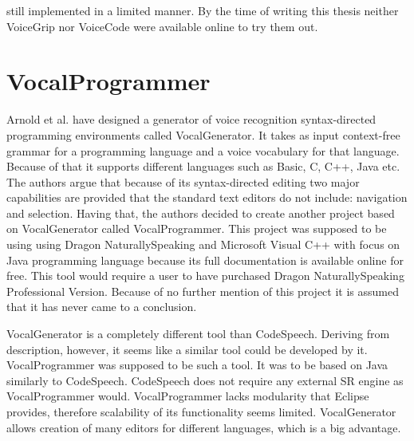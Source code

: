 still implemented in a limited manner. By the time of writing this thesis neither VoiceGrip nor VoiceCode were available online to try them out.

\section{VocalProgrammer}
Arnold et al. \cite{Arnold2000} have designed a generator of voice recognition syntax-directed programming environments called VocalGenerator. It takes as input context-free grammar for a programming language and a voice vocabulary for that language. Because of that it supports different languages such as Basic, C, C++, Java etc. The authors argue that because of its syntax-directed editing two major capabilities are provided that the standard text editors do not include: navigation and selection. Having that, the authors decided to create another project based on VocalGenerator called VocalProgrammer. This project was supposed to be using using Dragon NaturallySpeaking and Microsoft Visual C++ with focus on Java programming language because its full documentation is available online for free. This tool would require a user to have purchased Dragon NaturallySpeaking Professional Version. Because of no further mention of this project it is assumed that it has never came to a conclusion. 

VocalGenerator is a completely different tool than CodeSpeech. Deriving from description, however, it seems like a similar tool could be developed by it. VocalProgrammer was supposed to be such a tool. It was to be based on Java similarly to CodeSpeech. CodeSpeech does not require any external SR engine as VocalProgrammer would. VocalProgrammer lacks modularity that Eclipse provides, therefore scalability of its functionality seems limited. VocalGenerator allows creation of many editors for different languages, which is a big advantage.

